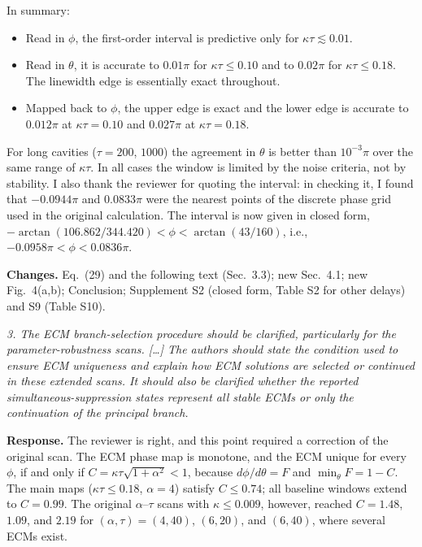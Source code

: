 \documentclass[11pt]{article}
\newenvironment{comment}{\par\medskip\noindent\begin{minipage}{\linewidth}\color{rc}\itshape}{\end{minipage}\par\smallskip}
\newcommand{\resp}{\noindent\textbf{Response.} }
\newcommand{\chg}{\par\noindent\textbf{Changes.} }
\begin{document}
In summary:
\begin{itemize}
\item Read in $\phi$, the first-order interval is predictive only for $\kappa\tau\lesssim0.01$.
\item Read in $\theta$, it is accurate to $0.01\pi$ for $\kappa\tau\le0.10$ and to $0.02\pi$ for $\kappa\tau\le0.18$. The linewidth edge is essentially exact throughout.
\item Mapped back to $\phi$, the upper edge is exact and the lower edge is accurate to $0.012\pi$ at $\kappa\tau=0.10$ and $0.027\pi$ at $\kappa\tau=0.18$.
\end{itemize}
For long cavities ($\tau=200$, $1000$) the agreement in $\theta$ is better than $10^{-3}\pi$ over the same range of $\kappa\tau$. In all cases the window is limited by the noise criteria, not by stability. I also thank the reviewer for quoting the interval: in checking it, I found that $-0.0944\pi$ and $0.0833\pi$ were the nearest points of the discrete phase grid used in the original calculation. The interval is now given in closed form, $-\arctan(106.862/344.420)<\phi<\arctan(43/160)$, i.e., $-0.0958\pi<\phi<0.0836\pi$.
\chg Eq.~(29) and the following text (Sec.~3.3); new Sec.~4.1; new Fig.~4(a,b); Conclusion; Supplement S2 (closed form, Table S2 for other delays) and S9 (Table S10).

\begin{comment}3. The ECM branch-selection procedure should be clarified, particularly for the parameter-robustness scans. [\dots] The authors should state the condition used to ensure ECM uniqueness and explain how ECM solutions are selected or continued in these extended scans. It should also be clarified whether the reported simultaneous-suppression states represent all stable ECMs or only the continuation of the principal branch.\end{comment}
\resp The reviewer is right, and this point required a correction of the original scan. The ECM phase map is monotone, and the ECM unique for every $\phi$, if and only if $C=\kappa\tau\sqrt{1+\alpha^2}<1$, because $d\phi/d\theta=F$ and $\min_\theta F=1-C$. The main maps ($\kappa\tau\le0.18$, $\alpha=4$) satisfy $C\le0.74$; all baseline windows extend to $C=0.99$. The original $\alpha$--$\tau$ scans with $\kappa\le0.009$, however, reached $C=1.48$, $1.09$, and $2.19$ for $(\alpha,\tau)=(4,40)$, $(6,20)$, and $(6,40)$, where several ECMs exist.
\end{document}
